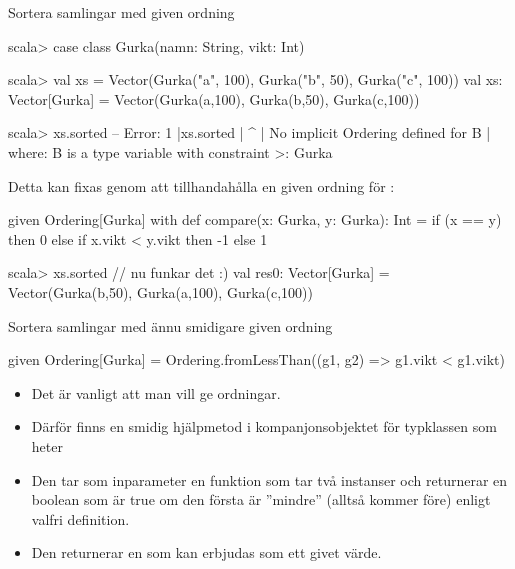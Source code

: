\begin{Slide}{Sortera samlingar med given ordning}\SlideFontSmall
\begin{REPLsmall}
scala> case class Gurka(namn: String, vikt: Int)
                                                                                                                                            
scala> val xs = Vector(Gurka("a", 100), Gurka("b", 50), Gurka("c", 100))
val xs: Vector[Gurka] = Vector(Gurka(a,100), Gurka(b,50), Gurka(c,100))
                                                                                                                                            
scala> xs.sorted
-- Error:
1 |xs.sorted
  | ^
  | No implicit Ordering defined for B
  | where: B is a type variable with constraint >: Gurka

\end{REPLsmall}
\pause
Detta kan fixas genom att tillhandahålla en given ordning för :
\begin{Code}
given Ordering[Gurka] with
  def compare(x: Gurka, y: Gurka): Int =
    if (x == y) then 0 
    else if x.vikt < y.vikt then -1 
    else 1
\end{Code}
\begin{REPL}
scala> xs.sorted   // nu funkar det :)
val res0: Vector[Gurka] = Vector(Gurka(b,50), Gurka(a,100), Gurka(c,100))
\end{REPL}
\end{Slide}

\begin{Slide}{Sortera samlingar med ännu smidigare given ordning}\SlideFontSmall

\begin{Code}
given Ordering[Gurka] = Ordering.fromLessThan((g1, g2) => g1.vikt < g1.vikt)
\end{Code}


\begin{itemize}
  \item Det är vanligt att man vill ge ordningar.
  \item Därför finns en smidig hjälpmetod i kompanjonsobjektet för typklassen  som heter 
  \item Den tar som inparameter en funktion som tar två instanser och returnerar en boolean som är true om den första är ''mindre'' (alltså kommer före) enligt valfri definition. 
  \item Den returnerar en  som kan erbjudas som ett givet värde.
\end{itemize}

\end{Slide}

